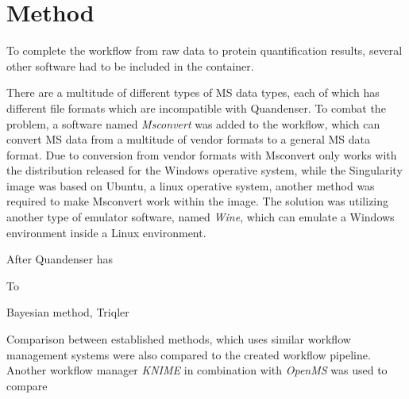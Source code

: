 \section{Method}

To complete the workflow from raw data to protein quantification results, several other software had to be included in the container.

There are a multitude of different types of MS data types, each of which has different file formats which are incompatible with Quandenser. To combat the problem, a software named \textit{Msconvert} was added to the workflow, which can convert MS data from a multitude of vendor formats to a general MS data format. Due to conversion from vendor formats with Msconvert only works with the distribution released for the Windows operative system, while the Singularity image was based on Ubuntu, a linux operative system, another method was required to make Msconvert work within the image. The solution was utilizing another type of emulator software, named \textit{Wine}, which can emulate a Windows environment inside a Linux environment.

After Quandenser has

To

Bayesian method, Triqler


Comparison between established methods, which uses similar workflow management systems were also compared to the created workflow pipeline. Another workflow manager \textit{KNIME} in combination with \textit{OpenMS} was used to compare
